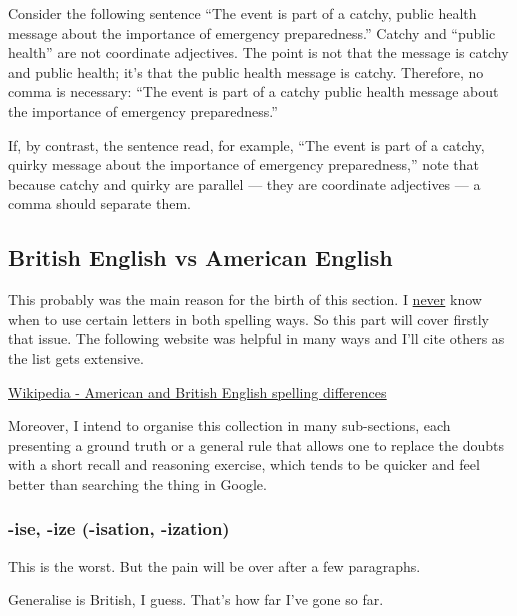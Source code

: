 Consider the following sentence ``The event is part of a catchy, public health message about the importance of emergency preparedness.''
Catchy and ``public health'' are not coordinate adjectives. The point is not that the message is catchy and public health; it's that the public health message is catchy. Therefore, no comma is necessary: ``The event is part of a catchy public health message about the importance of emergency preparedness.''

If, by contrast, the sentence read, for example, ``The event is part of a catchy, quirky message about the importance of emergency preparedness,'' note that because catchy and quirky are parallel — they are coordinate adjectives — a comma should separate them.



\subsection{British English vs American English}

This probably was the main reason for the birth of this section. I \ul{never} know when to use certain letters in both spelling ways. So this part will cover firstly that issue. The following website was helpful in many ways and I'll cite others as the list gets extensive.

\href{https://en.wikipedia.org/wiki/American_and_British_English_spelling_differences}{\ul{Wikipedia - American and British English spelling differences}}

Moreover, I intend to organise this collection in many sub-sections, each presenting a ground truth or a general rule that allows one to replace the doubts with a short recall and reasoning exercise, which tends to be quicker and feel better than searching the thing in Google.


\subsubsection{-ise, -ize (-isation, -ization)}
This is the worst. But the pain will be over after a few paragraphs.

Generalise is British, I guess. That's how far I've gone so far.




